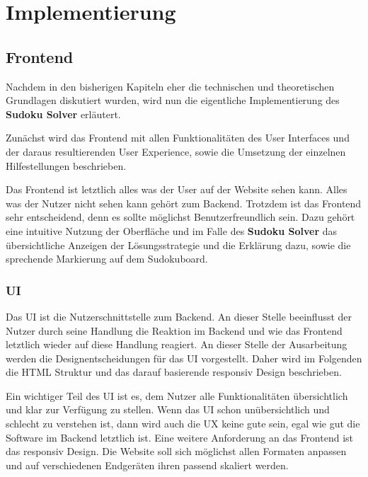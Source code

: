 
\part{Implementierung}

\chapter{Frontend}
Nachdem in den bisherigen Kapiteln eher die technischen und theoretischen Grundlagen diskutiert wurden, wird nun die eigentliche Implementierung des \textbf{Sudoku Solver} erläutert.

Zunächst wird das Frontend mit allen Funktionalitäten des User Interfaces und der daraus resultierenden User Experience, sowie die Umsetzung der einzelnen Hilfestellungen beschrieben.

Das Frontend ist letztlich alles was der User auf der Website sehen kann. Alles was der Nutzer nicht sehen kann gehört zum Backend. Trotzdem ist das Frontend sehr entscheidend, denn es sollte möglichst Benutzerfreundlich sein. Dazu gehört eine intuitive Nutzung der Oberfläche und im Falle des \textbf{Sudoku Solver} das übersichtliche Anzeigen der Lösungsstrategie und die Erklärung dazu, sowie die sprechende Markierung auf dem Sudokuboard.

\section{\acl{UI}}
Das \ac{UI} ist die Nutzerschnittstelle zum Backend. An dieser Stelle beeinflusst der Nutzer durch seine Handlung die Reaktion im Backend und wie das Frontend letztlich wieder auf diese Handlung reagiert. An dieser Stelle der Ausarbeitung werden die Designentscheidungen für das \ac{UI} vorgestellt. Daher wird im Folgenden die \ac{HTML} Struktur und das darauf basierende responsiv Design beschrieben.

Ein wichtiger Teil des \ac{UI} ist es, dem Nutzer alle Funktionalitäten übersichtlich und klar zur Verfügung zu stellen. Wenn das \ac{UI} schon unübersichtlich und schlecht zu verstehen ist, dann wird auch die \acs{UX} keine gute sein, egal wie gut die Software im Backend letztlich ist. Eine weitere Anforderung an das Frontend ist das responsiv Design. Die Website soll sich möglichst allen Formaten anpassen und auf verschiedenen Endgeräten ihren passend skaliert werden.

